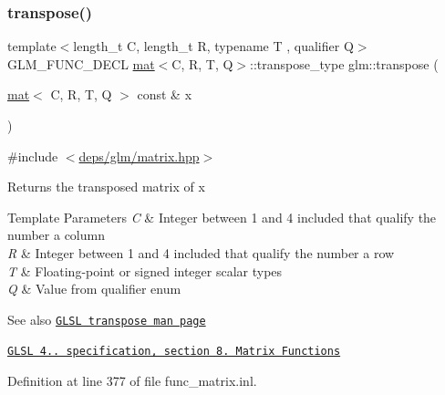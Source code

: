 \subsubsection{\texorpdfstring{transpose()}{transpose()}}
{\footnotesize\ttfamily template$<$length\+\_\+t C, length\+\_\+t R, typename T , qualifier Q$>$ \\
G\+L\+M\+\_\+\+F\+U\+N\+C\+\_\+\+D\+E\+CL \hyperlink{structglm_1_1mat}{mat}$<$C, R, T, Q$>$\+::transpose\+\_\+type glm\+::transpose (\begin{DoxyParamCaption}\item[{\hyperlink{structglm_1_1mat}{mat}$<$ C, R, T, Q $>$ const \&}]{x }\end{DoxyParamCaption})}



{\ttfamily \#include $<$\hyperlink{matrix_8hpp}{deps/glm/matrix.\+hpp}$>$}

Returns the transposed matrix of x


\begin{DoxyTemplParams}{Template Parameters}
{\em C} & Integer between 1 and 4 included that qualify the number a column \\
\hline
{\em R} & Integer between 1 and 4 included that qualify the number a row \\
\hline
{\em T} & Floating-\/point or signed integer scalar types \\
\hline
{\em Q} & Value from qualifier enum\\
\hline
\end{DoxyTemplParams}
\begin{DoxySeeAlso}{See also}
\href{http://www.opengl.org/sdk/docs/manglsl/xhtml/transpose.xml}{\tt G\+L\+SL transpose man page} 

\href{http://www.opengl.org/registry/doc/GLSLangSpec.4.20.8.pdf}{\tt G\+L\+SL 4.. specification, section 8. Matrix Functions} 
\end{DoxySeeAlso}


Definition at line 377 of file func\+\_\+matrix.\+inl.

